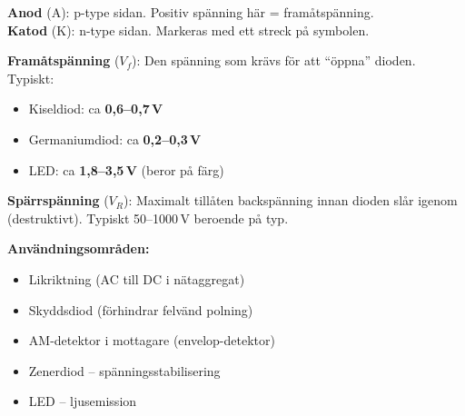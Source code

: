 \documentclass[a4paper,11pt,twoside]{book}
\newcommand{\emoji}[1]{{\emojifont #1}}
\begin{document}
\begin{bluebox}[title={\emoji{🔑} Dioden -- grundegenskaper}]
\textbf{Anod} (A): p-type sidan. Positiv spänning här = framåtspänning.\\
\textbf{Katod} (K): n-type sidan. Markeras med ett streck på symbolen.

\medskip
\textbf{Framåtspänning} ($V_f$): Den spänning som krävs för att
``öppna'' dioden. Typiskt:
\begin{itemize}
  \item Kiseldiod: ca \textbf{0,6--0,7\,V}
  \item Germaniumdiod: ca \textbf{0,2--0,3\,V}
  \item LED: ca \textbf{1,8--3,5\,V} (beror på färg)
\end{itemize}

\textbf{Spärrspänning} ($V_R$): Maximalt tillåten backspänning
innan dioden slår igenom (destruktivt). Typiskt 50--1000\,V
beroende på typ.

\medskip
\textbf{Användningsområden:}
\begin{itemize}
  \item Likriktning (AC till DC i nätaggregat)
  \item Skyddsdiod (förhindrar felvänd polning)
  \item AM-detektor i mottagare (envelop-detektor)
  \item Zenerdiod -- spänningsstabilisering
  \item LED -- ljusemission
\end{itemize}
\end{bluebox}
\end{document}
